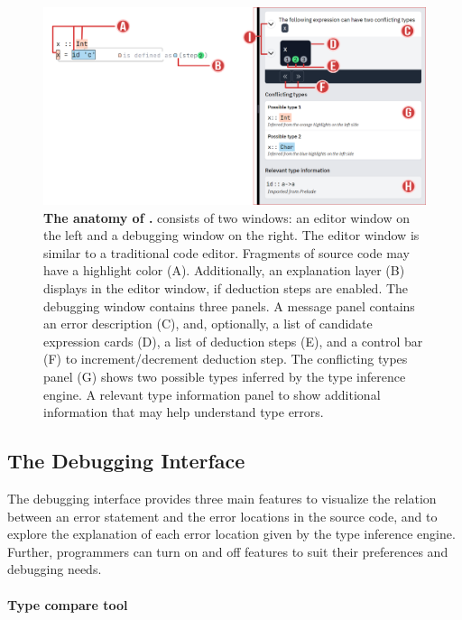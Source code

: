 \begin{figure}[h]
    \centering
    \includegraphics[width=\linewidth]{images/atonomy.png}
    \caption{
        \textbf{The anatomy of \chameleon{}.}
        \chameleon{} consists of two windows: an editor window on the left and a
        debugging window on the right. The editor window is similar to a
        traditional code editor. Fragments of source code may have a highlight
        color (A). Additionally, an explanation layer (B) displays in the editor
        window, if deduction steps are enabled. The debugging window contains
        three panels. A message panel contains an error description (C), and, optionally,
        a list of candidate expression cards (D), a list of deduction steps (E), 
        and a control bar (F) to increment/decrement deduction step. 
        The conflicting types
        panel (G) shows two possible types inferred by the type inference
        engine. A relevant type information panel to show additional information
        that may help understand type errors.
    }
    \label{fig:anatomy}
\end{figure}


\subsection{The Debugging Interface}

The \chameleon{} debugging interface provides three main features to visualize the relation between an error statement and the error locations in the source code, and to explore the explanation of each error location given by the type inference engine. Further, programmers  can turn on and off features to suit their preferences and debugging needs.



\paragraph{Type compare tool} \label{sub:type-compare}

